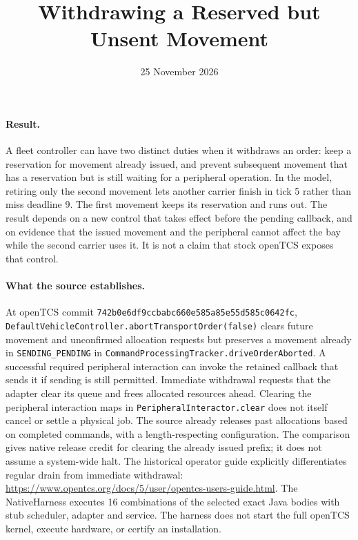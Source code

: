 \documentclass[11pt]{article}
\title{Withdrawing a Reserved but Unsent Movement}
\date{25 November 2026}
\begin{document}
\maketitle

\paragraph{Result.}
A fleet controller can have two distinct duties when it withdraws an order:
keep a reservation for movement already issued, and prevent subsequent
movement that has a reservation but is still waiting for a peripheral
operation. In the model, retiring only the second movement lets another
carrier finish in tick 5 rather than miss deadline 9. The first movement
keeps its reservation and runs out. The result depends on a new control
that takes effect before the pending callback, and on evidence that the
issued movement and the peripheral cannot affect the bay while the second
carrier uses it. It is not a claim that stock openTCS exposes that control.

\paragraph{What the source establishes.}
At openTCS commit
\texttt{742b0e6df9ccbabc660e585a85e55d585c0642fc},
\texttt{DefaultVehicleController.abortTransportOrder(false)}
clears future movement and unconfirmed allocation requests but preserves a
movement already in \texttt{SENDING\_PENDING} in
\texttt{CommandProcessingTracker.driveOrderAborted}. A successful
required peripheral interaction can invoke the retained callback that sends
it if sending is still permitted. Immediate withdrawal requests that the
adapter clear its queue and frees allocated resources ahead. Clearing the
peripheral interaction maps in \texttt{PeripheralInteractor.clear} does
not itself cancel or settle a physical job. The source already releases
past allocations based on completed commands, with a length-respecting
configuration. The comparison gives native release credit for clearing
the already issued prefix; it does not assume a system-wide halt.
The historical operator guide explicitly differentiates regular drain
from immediate withdrawal:
\url{https://www.opentcs.org/docs/5/user/opentcs-users-guide.html}.
The NativeHarness executes 16 combinations of the selected exact Java
bodies with stub scheduler, adapter and service. The harness does not start
the full openTCS kernel, execute hardware, or certify an installation.
\end{document}
